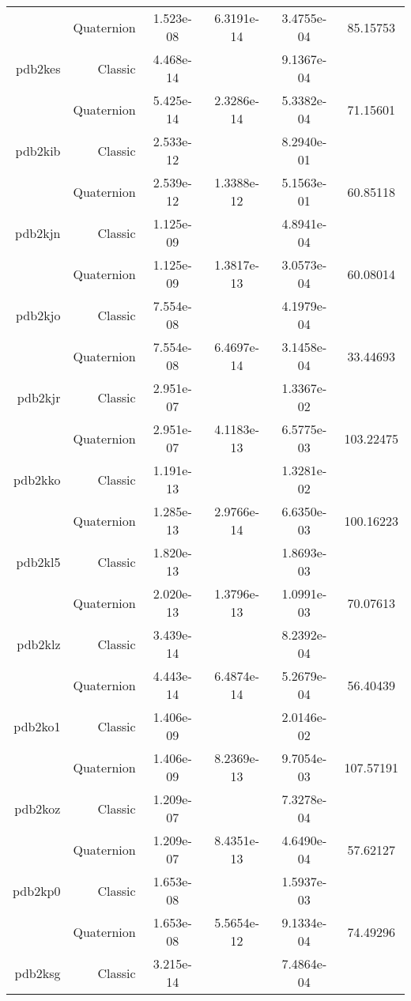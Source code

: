\begin{xltabular}{\textwidth}{r|rS[table-format=1.3e+2]S[table-format=1.4e+2]S[table-format=1.4e+2]S[table-format=-1.5]}
& Quaternion & 1.523e-08 & 6.3191e-14 & 3.4755e-04 & 85.15753\\  \addlinespace
pdb2kes & Classic & 4.468e-14 &  & 9.1367e-04 & \\
& Quaternion & 5.425e-14 & 2.3286e-14 & 5.3382e-04 & 71.15601\\  \addlinespace
pdb2kib & Classic & 2.533e-12 &  & 8.2940e-01 & \\
& Quaternion & 2.539e-12 & 1.3388e-12 & 5.1563e-01 & 60.85118\\  \addlinespace
pdb2kjn & Classic & 1.125e-09 &  & 4.8941e-04 & \\
& Quaternion & 1.125e-09 & 1.3817e-13 & 3.0573e-04 & 60.08014\\  \addlinespace
pdb2kjo & Classic & 7.554e-08 &  & 4.1979e-04 & \\
& Quaternion & 7.554e-08 & 6.4697e-14 & 3.1458e-04 & 33.44693\\  \addlinespace
pdb2kjr & Classic & 2.951e-07 &  & 1.3367e-02 & \\
& Quaternion & 2.951e-07 & 4.1183e-13 & 6.5775e-03 & 103.22475\\  \addlinespace
pdb2kko & Classic & 1.191e-13 &  & 1.3281e-02 & \\
& Quaternion & 1.285e-13 & 2.9766e-14 & 6.6350e-03 & 100.16223\\  \addlinespace
pdb2kl5 & Classic & 1.820e-13 &  & 1.8693e-03 & \\
& Quaternion & 2.020e-13 & 1.3796e-13 & 1.0991e-03 & 70.07613\\  \addlinespace
pdb2klz & Classic & 3.439e-14 &  & 8.2392e-04 & \\
& Quaternion & 4.443e-14 & 6.4874e-14 & 5.2679e-04 & 56.40439\\  \addlinespace
pdb2ko1 & Classic & 1.406e-09 &  & 2.0146e-02 & \\
& Quaternion & 1.406e-09 & 8.2369e-13 & 9.7054e-03 & 107.57191\\  \addlinespace
pdb2koz & Classic & 1.209e-07 &  & 7.3278e-04 & \\
& Quaternion & 1.209e-07 & 8.4351e-13 & 4.6490e-04 & 57.62127\\  \addlinespace
pdb2kp0 & Classic & 1.653e-08 &  & 1.5937e-03 & \\
& Quaternion & 1.653e-08 & 5.5654e-12 & 9.1334e-04 & 74.49296\\  \addlinespace
pdb2ksg & Classic & 3.215e-14 &  & 7.4864e-04 & \\

\end{xltabular}
